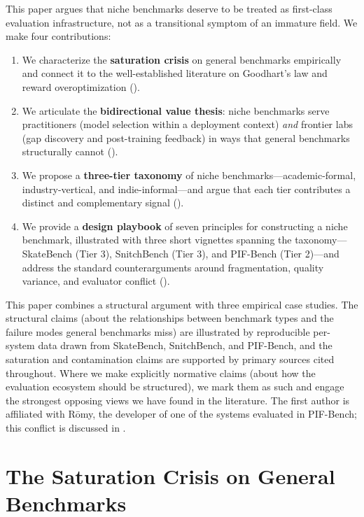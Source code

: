 \documentclass[11pt,a4paper]{article}
\begin{document}
This paper argues that niche benchmarks deserve to be treated as first-class evaluation infrastructure, not as a transitional symptom of an immature field. We make four contributions:

\begin{enumerate}[leftmargin=*]
  \item We characterize the \textbf{saturation crisis} on general benchmarks empirically and connect it to the well-established literature on Goodhart's law \citep{goodhart1975,strathern1997} and reward overoptimization ().
  \item We articulate the \textbf{bidirectional value thesis}: niche benchmarks serve practitioners (model selection within a deployment context) \emph{and} frontier labs (gap discovery and post-training feedback) in ways that general benchmarks structurally cannot ().
  \item We propose a \textbf{three-tier taxonomy} of niche benchmarks---academic-formal, industry-vertical, and indie-informal---and argue that each tier contributes a distinct and complementary signal ().
  \item We provide a \textbf{design playbook} of seven principles for constructing a niche benchmark, illustrated with three short vignettes spanning the taxonomy---SkateBench (Tier 3), SnitchBench (Tier 3), and PIF-Bench (Tier 2)---and address the standard counterarguments around fragmentation, quality variance, and evaluator conflict ().
\end{enumerate}

This paper combines a structural argument with three empirical case studies. The structural claims (about the relationships between benchmark types and the failure modes general benchmarks miss) are illustrated by reproducible per-system data drawn from SkateBench, SnitchBench, and PIF-Bench, and the saturation and contamination claims are supported by primary sources cited throughout. Where we make explicitly normative claims (about how the evaluation ecosystem should be structured), we mark them as such and engage the strongest opposing views we have found in the literature. The first author is affiliated with R\={o}my, the developer of one of the systems evaluated in PIF-Bench; this conflict is discussed in .

\section{The Saturation Crisis on General Benchmarks}
\label{sec:saturation}
\end{document}
